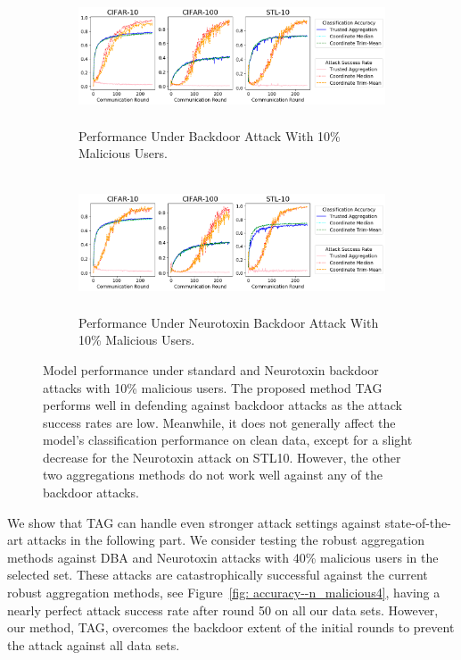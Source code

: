 \documentclass{article} %
\begin{document}
\begin{figure}[htp]
\centering
  \begin{subfigure}{\textwidth}
  \centering
    \includegraphics[height=4cm, width=\textwidth]{make_article/make_visuals/visuals/accuracy--n_malicious1--dba0--beta0.2--d_scale.png}
    \caption{\footnotesize Performance Under Backdoor Attack With 10\% Malicious Users.}
  \end{subfigure}%

  \begin{subfigure}{\textwidth}
  \centering
    \includegraphics[height=4cm, width=\textwidth]{make_article/make_visuals/visuals/accuracy--n_malicious1--dba0--beta0.2--d_scale--neuro_p0.1.png}
    \caption{\footnotesize Performance Under Neurotoxin Backdoor Attack With 10\% Malicious Users.}
  \end{subfigure}%
\caption{\footnotesize Model performance under standard and Neurotoxin backdoor attacks with 10\% malicious users. The proposed method TAG performs well in defending against backdoor attacks as the attack success rates are low. Meanwhile, it does not generally affect the model's classification performance on clean data, except for a slight decrease for the Neurotoxin attack on STL10. However, the other two aggregations methods do not work well against any of the backdoor attacks.} 
\label{fig: accuracy--n_malicious1}
\end{figure}

We show that TAG can handle even stronger attack settings against state-of-the-art attacks in the following part. We consider testing the robust aggregation methods against DBA and Neurotoxin attacks with 40\% malicious users in the selected set.  These attacks are catastrophically successful against the current robust aggregation methods, see Figure~\ref{fig: accuracy--n_malicious4}, having a nearly perfect attack success rate after round 50 on all our data sets. However, our method, TAG, overcomes the backdoor extent of the initial rounds to prevent the attack against all data sets. 
\end{document}
